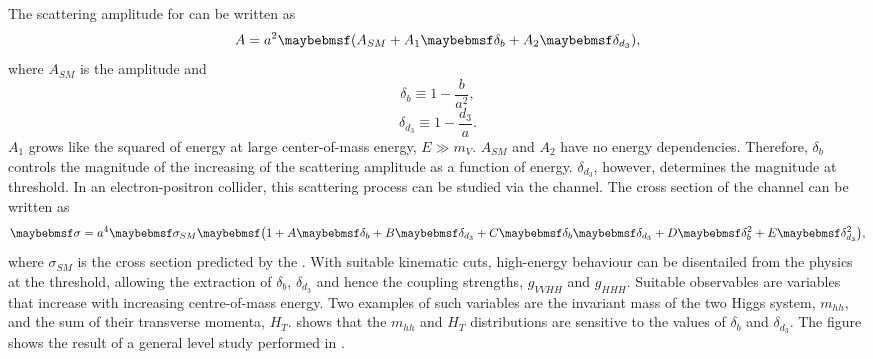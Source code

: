 The scattering amplitude for  can be written as
\begin{equation}
A = a^2\parenths{A_{SM} + A_1\delta_b + A_2\delta_{d_3}},
\end{equation}
where $A_{SM}$ is the \SM amplitude and
\begin{equation}
\delta_b \equiv 1 - \frac{b}{a^2},
\end{equation}
\begin{equation}
\delta_{d_3} \equiv 1 - \frac{d_3}{a}.
\end{equation}
$A_1$ grows like the squared of energy at large center-of-mass energy, $E\gg{m_V}$. $A_{SM}$ and $A_2$ have no energy dependencies. Therefore, $\delta_b$ controls the magnitude of the increasing of the scattering amplitude as a function of energy. $\delta_{d_3}$, however, determines the magnitude at threshold. In an electron-positron collider, this scattering process can be studied via the  channel. The cross section of the channel can be written as
\begin{equation}
\label{eq:theoryGeneralHiggsCrossSection}
\sigma = a^4\sigma_{SM}\parenths{1 + A\delta_b + B\delta_{d_3} + C\delta_b\delta_{d_3} + D\delta_b^2 + E\delta_{d_3}^2},
\end{equation}
where $\sigma_{SM}$ is the cross section predicted by the \SM. With suitable kinematic cuts, high-energy behaviour can be disentailed from the physics at the threshold, allowing the extraction of $\delta_{b}$, $\delta_{d_3}$ and hence the coupling strengths, $g_{VVHH}$ and $g_{HHH}$. Suitable observables are variables that increase with  increasing centre-of-mass energy. Two examples of such variables are the invariant mass of the two Higgs system, $m_{hh}$, and the sum of their transverse momenta, $H_T$.  shows that the $m_{hh}$ and $H_T$ distributions are sensitive to the values of $\delta_{b}$ and $\delta_{d_3}$. The figure shows the result of a general level study performed in \cite{Contino:2013gna}.

